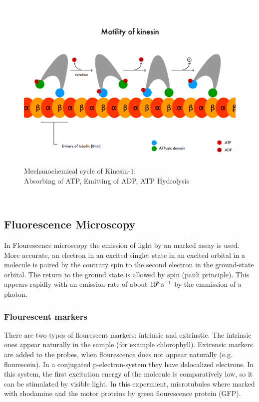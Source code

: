 		\begin{figure}[h]
				 			\centering
				 		   	\captionsetup{justification=centering}            
				 		    	  \includegraphics[scale=0.3]{pic/kinesin.png}
				 		    \caption{Mechanochemical cycle of Kinesin-1:\\ Absorbing of ATP, Emitting of ADP, ATP Hydrolysis\cite{wikiKinesin}}
				 		   	\label{int:kinesin} 
				\end{figure}\\
	\subsection{Fluorescence Microscopy}
       In Flourescence microscopy the emission of light by an marked assay is used. More accurate, an electron in an excited singlet state in an excited orbital in a molecule is paired by the contrary spin to the second electron in the ground-state orbital. The return to the ground state is allowed by spin (pauli principle). This appears rapidly with an emission rate of about $\unit[10^8]{s^{-1}}$ by the emmission of a photon.
        \subsubsection{Flourescent markers}
            There are two types of flourescent markers: intrinsic and extrinstic. The intrinsic ones appear naturally in the sample (for example chlorophyll). Extrensic markers are added to the probes, when flourescence does not appear naturally (e.g. flourescein).
            In a conjugated p-electron-system they have delocalized electrons. In this system, the first excitation energy of the molecule is comparatively low, so it can be stimulated by visible light.
            In this expermient, microtubules where marked with rhodamine and the motor proteins by green flourescence protein (GFP).
